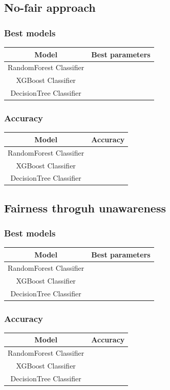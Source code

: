 \documentclass[12pt,a4paper,openright,twoside]{book}
\begin{document}
\subsection{No-fair approach}
\subsubsection{Best models}
\begin{tabular}{|c|c|}
    \hline
    \textbf{Model} & \textbf{Best parameters} \\
    \hline
    RandomForest Classifier  &  \\
    \hline
    XGBoost Classifier & \\
    \hline
    DecisionTree Classifier & \\
    \hline
\end{tabular}

\subsubsection{Accuracy}
\begin{tabular}{|c|c|}
    \hline
    \textbf{Model} & \textbf{Accuracy} \\ 
    \hline
    RandomForest Classifier  &  \\
    \hline
    XGBoost Classifier & \\
    \hline
    DecisionTree Classifier & \\ 
    \hline
\end{tabular}

\subsection{Fairness throguh unawareness}
\subsubsection{Best models}
\begin{tabular}{|c|c|}
    \hline
    \textbf{Model} & \textbf{Best parameters} \\
    \hline
    RandomForest Classifier  &  \\
    \hline
    XGBoost Classifier & \\
    \hline
    DecisionTree Classifier & \\ 
    \hline
\end{tabular}

\subsubsection{Accuracy}
\begin{tabular}{|c|c|}
    \hline
    \textbf{Model} & \textbf{Accuracy} \\
    \hline
    RandomForest Classifier  &  \\
    \hline
    XGBoost Classifier & \\
    \hline
    DecisionTree Classifier & \\ 

    \hline
\end{tabular}
\end{document}
